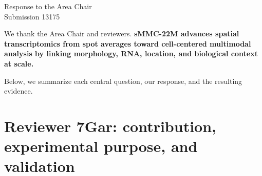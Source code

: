 \documentclass[10pt]{article}
\begin{document}
\begin{center}
{\Large Response to the Area Chair}\\[2pt]
Submission 13175
\end{center}

We thank the Area Chair and reviewers.
\textbf{sMMC-22M advances spatial transcriptomics from spot averages toward
cell-centered multimodal analysis by linking morphology, RNA, location, and
biological context at scale.}

Below, we summarize each central question, our response, and the resulting
evidence.

\section*{Reviewer 7Gar: contribution, experimental purpose, and validation}
\end{document}
